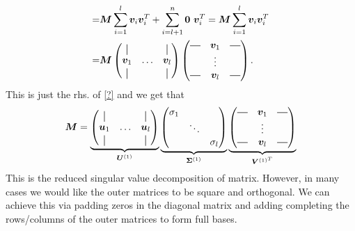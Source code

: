 \begin{align}
        =&
        \bm{M} \sum_{i=1}^l \bm{v}_i \bm{v}_i^T + \sum_{i=l+1}^n \bm{0} \ \bm{v}_i^T =
        \bm{M} \sum_{i=1}^l \bm{v}_i \bm{v}_i^T  \\
        =&     \bm{M}
        \begin{pmatrix}
        \vertbar &        & \vertbar \\
        \bm{v}_1 & \hdots & \bm{v}_l \\
        \vertbar &        & \vertbar 
        \end{pmatrix}
        \begin{pmatrix}
            \horzbar & \bm{v}_1 & \horzbar \\
                      & \vdots   &  \\
            \horzbar & \bm{v}_l &  \horzbar \\
        \end{pmatrix}.
    \end{align}
    This is just the rhs. of \eqref{?} and we get that 
    \begin{align}
        \bm{M} = 
        \underbrace{
            \begin{pmatrix}
                \vertbar &        & \vertbar \\
                \bm{u}_1 & \hdots & \bm{u}_l \\
                \vertbar &        & \vertbar 
            \end{pmatrix}
        }_{\bm{U}^{(1)}}
        \underbrace{
        \begin{pmatrix}
            \sigma_1 &        &          \\
                     & \ddots &          \\ 
                     &        & \sigma_l
        \end{pmatrix}
        }_{\bm{\Sigma}^{(1)}}
        \underbrace{
        \begin{pmatrix}
            \horzbar & \bm{v}_1 & \horzbar \\
                      & \vdots   &  \\
            \horzbar & \bm{v}_l &  \horzbar \\
        \end{pmatrix} 
        }_{\bm{V}^{(1)^T}}
    \end{align}
    This is the reduced singular value decomposition of matrix. 
    However, in many cases we would like the outer matrices to be 
    square and orthogonal. 
    We can achieve this via padding zeros in the diagonal matrix and 
    adding completing the rows/columns of the outer matrices to form full bases.
    
